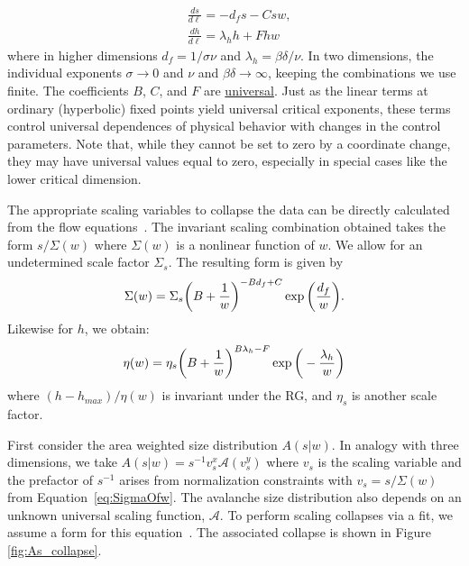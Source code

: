 \documentclass[reprint,amsmath,amssymb,aps,floatfix, prl]{revtex4-1}
\begin{document}
%
\begin{equation}
	\begin{split}
		&\frac{ds}{d\ell}= -d_f s-C s w ,\\ 
		&\frac{dh}{d\ell}= \lambda_h h+F h w
	\end{split}
\end{equation}
%
\noindent where in higher dimensions $d_f = 1/\sigma \nu$ and $\lambda_h = \beta \delta / \nu$. In two dimensions, the individual exponents $\sigma \to 0$ and
$\nu$ and $\beta \delta \to \infty$, keeping the combinations we use finite.  The coefficients $B$, $C$, and $F$ are \underline{universal}. Just as the linear terms at ordinary (hyperbolic) fixed points yield universal critical exponents, these terms control universal dependences of physical behavior with changes in the control parameters. Note that, while they cannot be set to zero by a coordinate change, they may have universal values equal to zero, especially in special cases like the lower critical dimension.\par
%
The appropriate scaling variables to collapse the data can be directly calculated from the flow equations~\cite{RFIM2Dsupp}. The invariant scaling combination obtained takes the form $s/\Sigma(w)$ where $\Sigma(w)$ is a nonlinear function of $w$. We allow for an undetermined scale factor $\Sigma_s$. The resulting form is given by 
%
\begin{equation}
 	\label{eq:SigmaOfw}
	\Sigma(w) = \Sigma_s \bigg{(}B+\frac{1}{w}\bigg{)}^{-B d_f+C}\exp \bigg{(}\frac{d_f}{w}\bigg{)} .
\end{equation}
%
\noindent Likewise for $h$, we obtain:
%
\begin{equation}
 	\label{eq:etaOfw}
	\eta(w) = \eta_s\bigg{(}B+\frac{1}{w}\bigg{)}^{B \lambda_h-F}\exp \bigg{(}-\frac{\lambda_h}{w}\bigg{)}
\end{equation}
%
\noindent where $(h-h_{max})/\eta(w)$ is invariant under the RG, and $\eta_s$ is another scale factor. \par
%
First consider the area weighted size distribution $A(s|w)$. In analogy with three dimensions, we take $A(s|w) = s^{-1}v_s^x \mathcal{A}(v_s^y)$ where $v_s$ is the scaling variable and the prefactor of $s^{-1}$ arises from normalization constraints with $v_s=s/\Sigma(w)$ from Equation~\ref{eq:SigmaOfw}. The avalanche size distribution also depends on an unknown universal scaling function, $\mathcal{A}$. To perform scaling collapses via a fit, we assume a form for this equation~\cite{RFIM2Dsupp}. The associated collapse is shown in Figure \ref{fig:As_collapse}. \par
\end{document}
